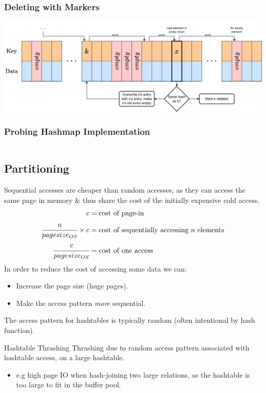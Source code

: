 \subsubsection{Deleting with Markers}
\begin{center}
    \includegraphics[width=.8\textwidth]{algorithms_and_indices/images/mark_deletion.drawio.png}
\end{center}

\subsubsection{Probing Hashmap Implementation}
\inputminted[firstline=98, lastline=247]{cpp}{algorithms_and_indices/code/hashtable_comparison/hashtables/probing.h}

\subsection{Partitioning}
Sequential accesses are cheaper than random accesses, as they can access the same page in memory \& thus share the cost of the initially expensive cold access.
\[\begin{split}
        c &= \text{cost of page-in } \\
        \cfrac{n}{pagesize_{OS}} \times c  &= \text{cost of sequentially accessing }n \text{ elements}\\
        \cfrac{c}{pagesize_{OS}} &= \text{cost of one access} \\
    \end{split}\]
In order to reduce the cost of accessing some data we can:
\begin{itemize}
    \item Increase the page size (huge pages).
    \item Make the access pattern \textit{more} sequential.
\end{itemize}
The access pattern for hashtables is typically random (often intentional by hash function).
\begin{definitionbox}{Hashtable Thrashing}
    Thrashing due to random access pattern associated with hashtable access, on a large hashtable.
    \begin{itemize}
        \item e.g high page IO when hash-joining two large relations, as the hashtable is too large to fit in the buffer pool.
    \end{itemize}
\end{definitionbox}

